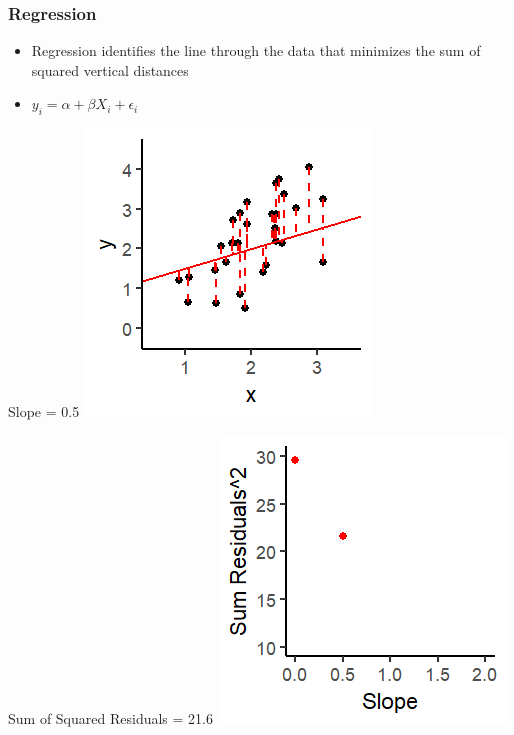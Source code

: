 \documentclass[xcolor=x11names,compress]{beamer}\usepackage[]{graphicx}\usepackage[]{color}
\makeatletter
\def\maxwidth{ %
  \ifdim\Gin@nat@width>\linewidth
    \linewidth
  \else
    \Gin@nat@width
  \fi
}
\newenvironment{knitrout}{}{} %
\renewcommand{\(}{\begin{columns}}
\renewcommand{\)}{\end{columns}}
\newcommand{\<}[1]{\begin{column}{#1}}
\renewcommand{\>}{\end{column}}
\makeatother
\begin{document}
\begin{frame}
\frametitle{Regression}
\begin{itemize}
\item Regression identifies the line through the data that minimizes the sum of squared vertical distances 
\item $y_i = \alpha + \beta X_i + \epsilon_i$
\end{itemize}
\begin{multicols}{2}
Slope = 0.5
\begin{knitrout}
\color{fgcolor}
\includegraphics[width=\maxwidth]{figure/graph_ols2-1} 

\end{knitrout}
\columnbreak
Sum of Squared Residuals = 21.6
\begin{knitrout}
\color{fgcolor}
\includegraphics[width=\maxwidth]{figure/graph_ssr2-1} 

\end{knitrout}
\end{multicols}
\end{frame}
\end{document}

